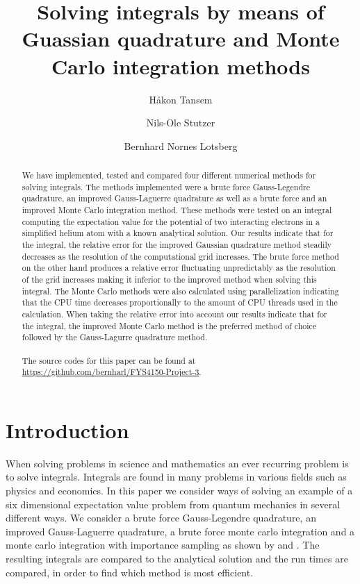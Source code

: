 \documentclass[10pt, twocolumn]{aastex62}
\begin{document}
\title{Solving integrals by means of Guassian quadrature and Monte Carlo integration methods}

\author{Håkon Tansem}

\author{Nils-Ole Stutzer}

\author{Bernhard Nornes Lotsberg}

\begin{abstract}
	We have implemented, tested and compared four different numerical methods
	for solving integrals. The methods implemented were a brute force
	Gauss-Legendre quadrature, an improved Gauss-Laguerre quadrature as well as
	a brute force and an improved Monte Carlo integration method. These methods
	were tested on an integral computing the expectation value for the potential
	of two interacting electrons in a simplified helium atom with a known
	analytical solution. Our results indicate that for the integral, the
	relative error for the improved Gaussian quadrature method steadily
	decreases as the resolution of the computational grid increases. The brute
	force method on the other hand produces a relative error fluctuating
	unpredictably as the resolution of the grid increases making it inferior to
	the improved method when solving this integral. The Monte Carlo methods were
	also calculated using parallelization indicating that the CPU time decreases
	proportionally to the amount of CPU threads used in the calculation. When
	taking the relative error into account our results indicate that for the
	integral, the improved Monte Carlo method is the preferred method of choice
	followed by the Gauss-Lagurre quadrature method. \\\\
	The source codes for this paper can be found at
	\href{https://github.com/bernharl/FYS4150-Project-3}{https://github.com/bernharl/FYS4150-Project-3}.  
	 
\end{abstract}

\section{Introduction} \label{sec:intro}
When solving problems in science and mathematics an ever recurring problem is to
solve integrals. Integrals are found in many problems in various fields such as
physics and economics. In this paper we consider ways of solving an example
of a six dimensional expectation value problem from quantum mechanics
in several different ways. We consider a brute force Gauss-Legendre quadrature,
an improved Gauss-Laguerre quadrature, a brute force monte carlo integration and
a monte carlo integration with importance sampling as shown by \cite{press:2007}
and \cite{jensen:2015}. The resulting integrals are compared to the
analytical solution and the run times are compared, in order to find which
method is most efficient.
\end{document}
